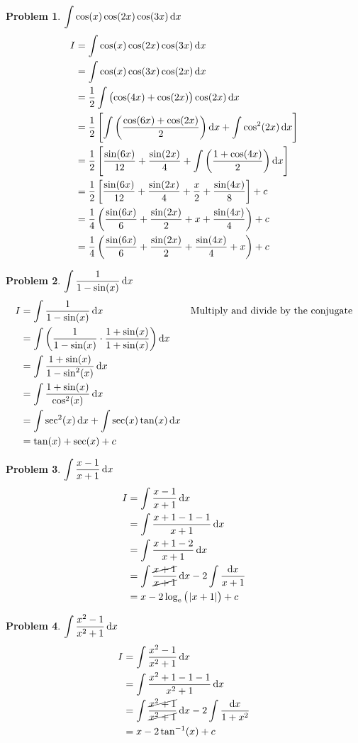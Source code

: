 \documentclass[14]{article}
\theoremstyle{definition}
\newtheorem{prob}{Problem}
\theoremstyle{case}
\begin{document}
\begin{prob}
$\displaystyle\int \cos(x) \cos(2x) \cos(3x) \dif x$
\begin{align*}
I &= \int \cos(x) \cos(2x) \cos(3x) \dif x\\
&= \int \cos(x) \cos(3x) \cos(2x) \dif x\\
&= \dfrac12 \int \left( \cos(4x) + \cos(2x) \right) \cos(2x) \dif x\\
&= \dfrac12 \left[ \int\left( \dfrac{\cos(6x) + \cos(2x)}{2}\right)\dif x + \int \cos^2(2x) \dif x \right]\\
&= \dfrac12 \left[ \dfrac{\sin(6x)}{12} + \dfrac{\sin(2x)}{4} + \int\left( \dfrac{1 + \cos(4x)}{2} \right)\dif x \right]\\
&= \dfrac12 \left[ \dfrac{\sin(6x)}{12} + \dfrac{\sin(2x)}{4} + \dfrac{x}2 + \dfrac{\sin(4x)}{8} \right]+c\\
&= \dfrac14 \left( \dfrac{\sin(6x)}{6} + \dfrac{\sin(2x)}{2} + x + \dfrac{\sin(4x)}{4} \right)+c\\
&= \dfrac14 \left( \dfrac{\sin(6x)}{6} + \dfrac{\sin(2x)}{2} + \dfrac{\sin(4x)}{4} +x \right)+c
\end{align*}
\end{prob}
\begin{prob}
$\displaystyle\int \dfrac{1}{1-\sin(x)} \dif x$
\begin{align*}
I &= \int \dfrac{1}{1-\sin(x)} \dif x && \text{Multiply and divide by the conjugate}\\
&= \int \left( \dfrac{1}{1-\sin(x)} \cdot \dfrac{1+\sin(x)}{1+\sin(x)} \right) \dif x\\
&= \int \dfrac{1 + \sin(x)}{1 - \sin^2(x)}\dif x\\
&= \int \dfrac{1 + \sin(x)}{\cos^2(x)}\dif x\\
&= \int \sec^2(x) \dif x + \int \sec(x) \tan(x) \dif x\\
&= \tan(x) + \sec(x) + c
\end{align*}
\end{prob}
\pagebreak
\begin{prob}
$\displaystyle\int \dfrac{x-1}{x+1} \dif x$
\begin{align*}
I &= \int \dfrac{x-1}{x+1}\dif x\\
&= \int \dfrac{x+1 -1 -1}{x+1} \dif x\\
&= \int \dfrac{x+1-2}{x+1}\dif x\\
&= \int \dfrac{\cancel{x+1}}{\cancel{x+1}} \dif x - 2\int \dfrac{\dif x}{x+1}\\
&= x - 2\log_{\rm e}\left(\; \abs{x+1}\right) + c
\end{align*}
\end{prob}
\begin{prob}
$\displaystyle \int \dfrac{x^2-1}{x^2+1}\dif x$
\begin{align*}
I &= \int \dfrac{x^2-1}{x^2+1}\dif x\\
&= \int \dfrac{x^2 + 1 - 1 - 1}{x^2 + 1} \dif x\\
&= \int \dfrac{\cancel{x^2 + 1}}{\cancel{x^2 + 1}}\dif x - 2 \int \dfrac{\dif x}{1 + x^2}\\
&= x - 2\tan^{-1}(x) + c
\end{align*}
\end{prob}
\pagebreak
\end{document}
